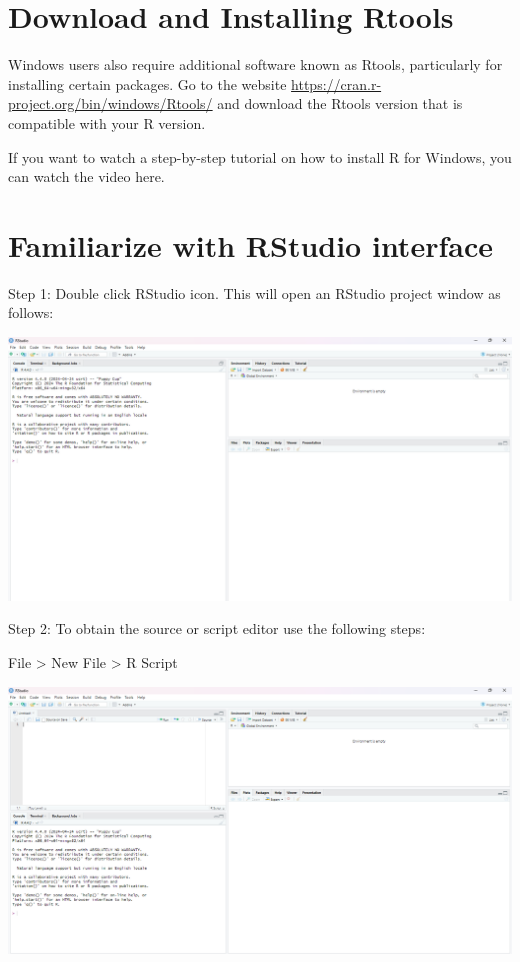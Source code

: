 \documentclass[
  letterpaper,
  DIV=11,
  numbers=noendperiod]{scrreprt}
\begin{document}
\hypertarget{download-and-installing-rtools}{%
\section{Download and Installing
Rtools}\label{download-and-installing-rtools}}

Windows users also require additional software known as Rtools,
particularly for installing certain packages. Go to the website
\url{https://cran.r-project.org/bin/windows/Rtools/} and download the
Rtools version that is compatible with your R version.

If you want to watch a step-by-step tutorial on how to install R for
Windows, you can watch the video here.

\hypertarget{familiarize-with-rstudio-interface}{%
\section{Familiarize with RStudio
interface}\label{familiarize-with-rstudio-interface}}

Step 1: Double click RStudio icon. This will open an RStudio project
window as follows:

\includegraphics[width=5.33in,height=\textheight]{img/chap1/rw1.png}

Step 2: To obtain the source or script editor use the following steps:

File \textgreater{} New File \textgreater{} R Script

\includegraphics[width=5.33in,height=\textheight]{img/chap1/rw2.png}
\end{document}
